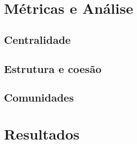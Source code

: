 \documentclass[a4paper,11pt]{article}
\begin{document}


\section{Métricas e Análise}\label{sec:metricas}


\subsection{Centralidade}

\subsection{Estrutura e coesão}

\subsection{Comunidades}

\section{Resultados}\label{sec:resultados}
\end{document}
